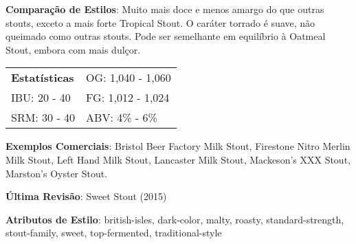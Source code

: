 \textbf{Comparação de Estilos}: Muito mais doce e menos amargo do que outras stouts, exceto a mais forte Tropical Stout. O caráter torrado é suave, não queimado como outras stouts. Pode ser semelhante em equilíbrio à Oatmeal Stout, embora com mais dulçor.

\begin{tabular}{@{}p{35mm}p{35mm}@{}}
  \textbf{Estatísticas} & OG: 1,040 - 1,060 \\
  IBU: 20 - 40  & FG: 1,012 - 1,024 \\
  SRM: 30 - 40  & ABV: 4\% - 6\%
\end{tabular}

\textbf{Exemplos Comerciais}: Bristol Beer Factory Milk Stout, Firestone Nitro Merlin Milk Stout, Left Hand Milk Stout, Lancaster Milk Stout, Mackeson's XXX Stout, Marston’s Oyster Stout.

\textbf{Última Revisão}: Sweet Stout (2015)

\textbf{Atributos de Estilo}: british-isles, dark-color, malty, roasty, standard-strength, stout-family, sweet, top-fermented, traditional-style
